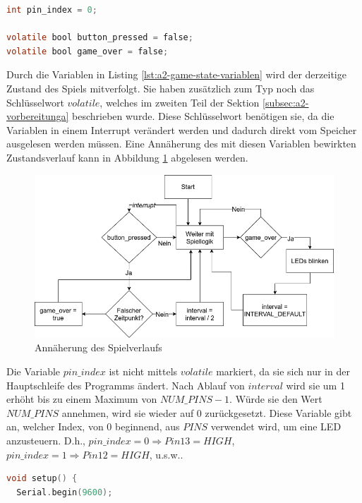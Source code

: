\begin{lstlisting}[language=C,label={lst:a2-game-state-variablen}, caption={Variablen zur Zustandsbestimmung des Spiels}]
int pin_index = 0;

volatile bool button_pressed = false;
volatile bool game_over = false;
\end{lstlisting}

Durch die Variablen in Listing \ref{lst:a2-game-state-variablen} wird der derzeitige Zustand des Spiels mitverfolgt.
Sie haben zusätzlich zum Typ noch das Schlüsselwort $volatile$, welches im zweiten Teil der Sektion \ref{subsec:a2-vorbereitunga} beschrieben wurde.
Diese Schlüsselwort benötigen sie, da die Variablen in einem Interrupt verändert werden und dadurch direkt vom Speicher ausgelesen werden müssen.
Eine Annäherung des mit diesen Variablen bewirkten Zustandsverlauf kann in Abbildung \ref{fig:annäherung-des-spielverlaufs} abgelesen werden.

\begin{figure}[ht]
    \centering
    \includegraphics[width=\textwidth]{pictures/a2-game-state.png}
    \caption{Annäherung des Spielverlaufs}
    \label{fig:annäherung-des-spielverlaufs}
\end{figure}


Die Variable $pin\_index$ ist nicht mittels $volatile$ markiert, da sie sich nur in der Hauptschleife des Programms ändert.
Nach Ablauf von $interval$ wird sie um 1 erhöht bis zu einem Maximum von $NUM\_PINS - 1$.
Würde sie den Wert $NUM\_PINS$ annehmen, wird sie wieder auf 0 zurückgesetzt.
Diese Variable gibt an, welcher Index, von 0 beginnend, aus $PINS$ verwendet wird, um eine LED anzusteuern.
D.h., $pin\_index = 0 \Rightarrow Pin13 = HIGH$, $pin\_index = 1 \Rightarrow Pin12 = HIGH$, u.s.w..

\begin{lstlisting}[language=C,label={lst:a2-serial-begin}, caption={Einstellen der seriellen Schnittstelle}]
void setup() {
  Serial.begin(9600);
\end{lstlisting}

